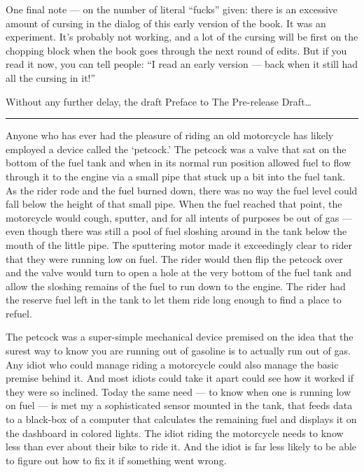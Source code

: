 \documentclass[]{scrbook}
\begin{document}
One final note --- on the number of literal ``fucks'' given: there is an
excessive amount of cursing in the dialog of this early version of the
book. It was an experiment. It's probably not working, and a lot of the
cursing will be first on the chopping block when the book goes through
the next round of edits. But if you read it now, you can tell people:
``I read an early version --- back when it still had all the cursing in
it!''

Without any further delay, the draft Preface to The Pre-release
Draft\ldots{}

\begin{center}\rule{0.5\linewidth}{\linethickness}\end{center}

Anyone who has ever had the pleasure of riding an old motorcycle has
likely employed a device called the `petcock.' The petcock was a valve
that sat on the bottom of the fuel tank and when in its normal run
position allowed fuel to flow through it to the engine via a small pipe
that stuck up a bit into the fuel tank. As the rider rode and the fuel
burned down, there was no way the fuel level could fall below the height
of that small pipe. When the fuel reached that point, the motorcycle
would cough, sputter, and for all intents of purposes be out of gas ---
even though there was still a pool of fuel sloshing around in the tank
below the mouth of the little pipe. The sputtering motor made it
exceedingly clear to rider that they were running low on fuel. The rider
would then flip the petcock over and the valve would turn to open a hole
at the very bottom of the fuel tank and allow the sloshing remains of
the fuel to run down to the engine. The rider had the reserve fuel left
in the tank to let them ride long enough to find a place to refuel.

The petcock was a super-simple mechanical device premised on the idea
that the surest way to know you are running out of gasoline is to
actually run out of gas. Any idiot who could manage riding a motorcycle
could also manage the basic premise behind it. And most idiots could
take it apart could see how it worked if they were so inclined. Today
the same need --- to know when one is running low on fuel --- is met my
a sophisticated sensor mounted in the tank, that feeds data to a
black-box of a computer that calculates the remaining fuel and displays
it on the dashboard in colored lights. The idiot riding the motorcycle
needs to know less than ever about their bike to ride it. And the idiot
is far less likely to be able to figure out how to fix it if something
went wrong.
\end{document}

